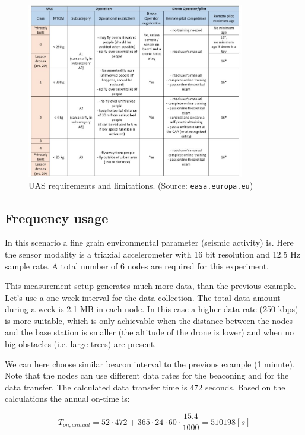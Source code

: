 \documentclass[conference]{IEEEtran}
\begin{document}
\begin{figure}[t]
	\centering
	\includegraphics[width=0.85\textwidth]{fig/legal.png}
  \caption{UAS requirements and limitations. (Source: \texttt{easa.europa.eu})}
	\label{fig-uav-legal}
\end{figure}
\subsection{Frequency usage}

In this scenario a fine grain environmental parameter (seismic activity) is. Here the
sensor modality is a triaxial accelerometer with 16 bit resolution and 12.5 Hz
sample rate. A total number of 6 nodes are required for this experiment.

This measurement setup generates much more data, than the previous example. Let's
use a one week interval for the data collection. The total data amount during
a week is 2.1 MB in each node. In this case a higher data rate (250 kbps) is more
suitable, which is only achievable when the distance between the nodes and the
base station is smaller (the altitude of the drone is lower) and when no big
obstacles (i.e. large trees) are present.

We can here choose similar beacon interval to the previous example (1 minute). Note
that the nodes can use different data rates for the beaconing and for the
data transfer. The calculated data transfer time is 472 seconds. Based on
the calculations the annual on-time is:

\begin{equation}
    T_{on,annual} = 52 \cdot 472 + 365 \cdot 24 \cdot 60 \cdot \frac{15.4}{1000} = 510198 [s]
\end{equation}
\end{document}
